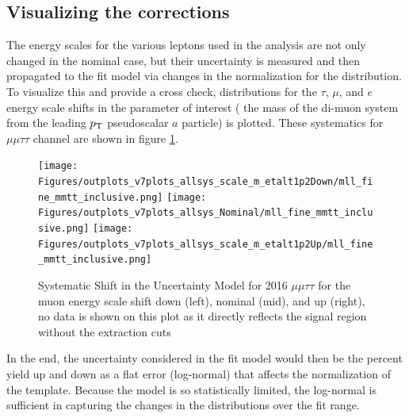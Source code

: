 \subsection{Visualizing the corrections}

The energy scales for the various leptons used in the analysis are not only changed in the nominal case, but their uncertainty is measured and then propagated to the fit model via changes in the normalization for the distribution. To visualize this and provide a cross check, distributions for the $\tau$, $\mu$, and $e$ energy scale shifts in the parameter of interest ( the mass of the di-muon system from the leading $p_{\mathrm{T}}$ pseudoscalar $a$ particle) is plotted. 
These systematics for $\mu\mu\tau\tau$ channel are shown in figure \ref{fig:sys_shift_mmtt2016}.
\begin{figure}[ht!b]
  \centering
\texttt{[image: Figures/outplots\_v7plots\_allsys\_scale\_m\_etalt1p2Down/mll\_fine\_mmtt\_inclusive.png]} 
\texttt{[image: Figures/outplots\_v7plots\_allsys\_Nominal/mll\_fine\_mmtt\_inclusive.png]}
\texttt{[image: Figures/outplots\_v7plots\_allsys\_scale\_m\_etalt1p2Up/mll\_fine\_mmtt\_inclusive.png]} \\

    \caption{\label{fig:sys_shift_mmtt2016} Systematic Shift in the Uncertainty Model for 2016 $\mu\mu\tau\tau$ for the muon energy scale shift down (left), nominal (mid), and up (right), no data is shown on this plot as it directly reflects the signal region without the extraction cuts }
\end{figure}

In the end, the uncertainty considered in the fit model would then be the percent yield up and down as a flat error (log-normal) that affects the normalization of the template. Because the model is so statistically limited, the log-normal is sufficient in capturing the changes in the distributions over the fit range.  
